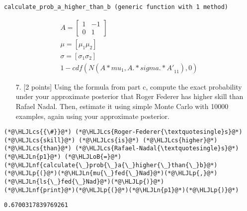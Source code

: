 \documentclass[12pt,a4paper]{article}
\newcommand{\HLJLn}[1]{#1}
\newcommand{\HLJLnf}[1]{\textcolor[RGB]{66,102,213}{#1}}
\newcommand{\HLJLoB}[1]{\textcolor[RGB]{102,102,102}{\textbf{#1}}}
\newcommand{\HLJLp}[1]{#1}
\newcommand{\HLJLcs}[1]{\textcolor[RGB]{153,153,119}{\textit{#1}}}
\begin{document}
\begin{lstlisting}
calculate_prob_a_higher_than_b (generic function with 1 method)
\end{lstlisting}



\begin{align}
A =
\begin{bmatrix}
1 & -1\\
0 & 1
\end{bmatrix}\\
\mu = [\mu_1 \mu_2]\\
\sigma = [\sigma_1 \sigma_2]\\
1 - cdf(N({A * mu}_1, {A .* sigma .* A'}_{11}), 0)
\end{align}
\begin{itemize}
\item[7. ] [2 points] Using the formula from part c, compute the exact probability under your approximate posterior that Roger Federer has higher skill than Rafael Nadal. Then, estimate it using simple Monte Carlo with 10000 examples, again using your approximate posterior.

\end{itemize}

\begin{lstlisting}
(*@\HLJLcs{{\#}}@*) (*@\HLJLcs{Roger-Federer{\textquotesingle}s}@*) (*@\HLJLcs{skill}@*) (*@\HLJLcs{is}@*) (*@\HLJLcs{higher}@*) (*@\HLJLcs{than}@*) (*@\HLJLcs{Rafael-Nadal{\textquotesingle}s}@*)
(*@\HLJLn{p1}@*) (*@\HLJLoB{=}@*) (*@\HLJLnf{calculate{\_}prob{\_}a{\_}higher{\_}than{\_}b}@*)(*@\HLJLp{(}@*)(*@\HLJLn{mu{\_}fed{\_}Nad}@*)(*@\HLJLp{,}@*) (*@\HLJLn{ls{\_}fed{\_}Nad}@*)(*@\HLJLp{)}@*)
(*@\HLJLnf{print}@*)(*@\HLJLp{(}@*)(*@\HLJLn{p1}@*)(*@\HLJLp{)}@*)
\end{lstlisting}

\begin{lstlisting}
0.6700317839769261
\end{lstlisting}
\end{document}
